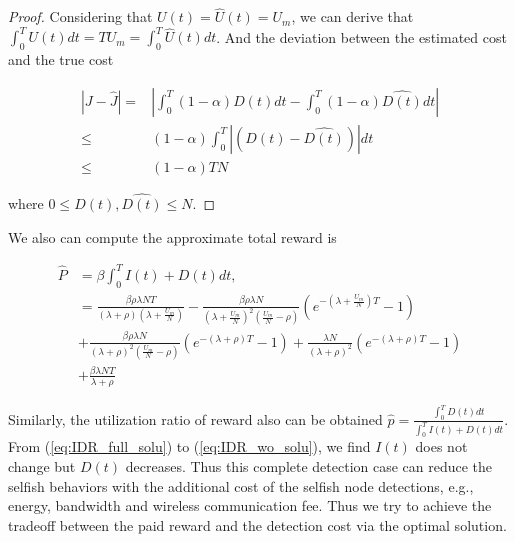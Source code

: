 \begin{proof}
Considering that $U(t) = \hat{U}(t) = U_{m}$,
we can derive that $\int_{0}^{T} U(t) dt = T U_{m} = \int_{0}^{T} \hat{U}(t) dt $.
And the deviation between the estimated cost and the true cost
\begin{small}
\begin{equation}
\label{eq:delta_J}
\begin{aligned}
|J - \hat{J}| = & \left| \int_{0}^{T} (1-\alpha)D(t) dt - \int_{0}^{T} (1-\alpha) \hat{D(t)} dt \right| \\
\le & (1-\alpha) \int_{0}^{T} |(D(t)-\hat{D(t)})| dt \\
\le & (1-\alpha) T N
\end{aligned}
\end{equation}
\end{small}
where $0 \le D(t), \hat{D(t)} \le N$.

\end{proof}

We also can compute the approximate total reward is
\begin{small}
\begin{equation}
\nonumber
\begin{aligned}
\hat{P} &= \beta \int_{0}^{T} I(t) + D(t) dt, \\
& = \frac{\beta \rho \lambda N T}{ (\lambda + \rho)(\lambda + \frac{U_{m}}{N}) }
- \frac{\beta \rho \lambda N}{ {(\lambda + \frac{U_{m}}{N})}^{2} (\frac{U_{m}}{N} - \rho)}
(e^{-(\lambda + \frac{U_{m}}{N})T} - 1 ) \\
&+ \frac{\beta \rho \lambda N }{ {(\lambda + \rho)}^{2} (\frac{U_{m}}{N} - \rho) }
(e^{-(\lambda + \rho)T} - 1 ) 
+ \frac{ \lambda N }{ (\lambda + \rho)^2 } (e^{-(\lambda + \rho)T} - 1 ) \\
& + \frac{ \beta \lambda N T }{ \lambda + \rho }
\end{aligned}
\end{equation}
\end{small}
Similarly, the utilization ratio of reward also can be obtained
$\hat{p} = \frac{\int_{0}^{T} D(t) dt}{\int_{0}^{T} I(t) + D(t) dt}$.
From (\ref{eq:IDR_full_solu}) to (\ref{eq:IDR_wo_solu}),
we find $I(t)$ does not change but $D(t)$ decreases.
Thus this complete detection case can reduce the selfish behaviors
with the additional cost of the selfish node detections,
e.g., energy, bandwidth and wireless communication fee.
Thus we try to achieve the tradeoff between the paid reward and the detection cost
via the optimal solution.